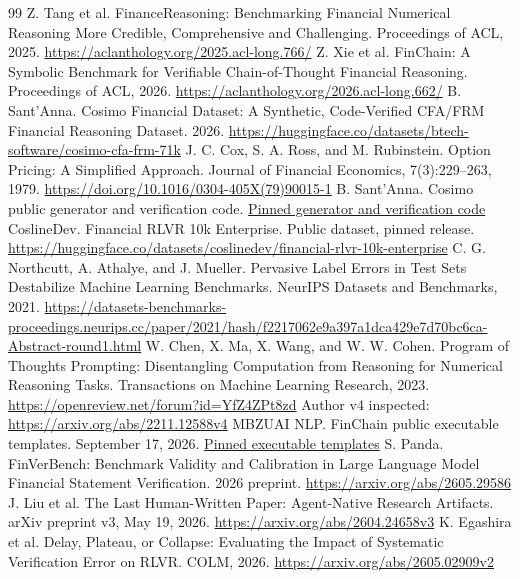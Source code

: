 \begin{thebibliography}{99}
 Z. Tang et al. FinanceReasoning: Benchmarking Financial Numerical Reasoning More Credible, Comprehensive and Challenging. Proceedings of ACL, 2025. \url{https://aclanthology.org/2025.acl-long.766/}
 Z. Xie et al. FinChain: A Symbolic Benchmark for Verifiable Chain-of-Thought Financial Reasoning. Proceedings of ACL, 2026. \url{https://aclanthology.org/2026.acl-long.662/}
 B. Sant'Anna. Cosimo Financial Dataset: A Synthetic, Code-Verified CFA/FRM Financial Reasoning Dataset. 2026. \url{https://huggingface.co/datasets/btech-software/cosimo-cfa-frm-71k}
 J. C. Cox, S. A. Ross, and M. Rubinstein. Option Pricing: A Simplified Approach. Journal of Financial Economics, 7(3):229--263, 1979. \url{https://doi.org/10.1016/0304-405X(79)90015-1}
 B. Sant'Anna. Cosimo public generator and verification code. \href{https://github.com/btech-software/cosimo/tree/20668622104bf8237837efd67debd1419f7bbe33/dataset}{Pinned generator and verification code}
 CoslineDev. Financial RLVR 10k Enterprise. Public dataset, pinned release. \url{https://huggingface.co/datasets/coslinedev/financial-rlvr-10k-enterprise}
 C. G. Northcutt, A. Athalye, and J. Mueller. Pervasive Label Errors in Test Sets Destabilize Machine Learning Benchmarks. NeurIPS Datasets and Benchmarks, 2021. \url{https://datasets-benchmarks-proceedings.neurips.cc/paper/2021/hash/f2217062e9a397a1dca429e7d70bc6ca-Abstract-round1.html}
 W. Chen, X. Ma, X. Wang, and W. W. Cohen. Program of Thoughts Prompting: Disentangling Computation from Reasoning for Numerical Reasoning Tasks. Transactions on Machine Learning Research, 2023. \url{https://openreview.net/forum?id=YfZ4ZPt8zd} Author v4 inspected: \url{https://arxiv.org/abs/2211.12588v4}
 MBZUAI NLP. FinChain public executable templates. September 17, 2026. \href{https://github.com/mbzuai-nlp/finchain/tree/9bd2942b85d992844b77094a8b822aa16832703c}{Pinned executable templates}
 S. Panda. FinVerBench: Benchmark Validity and Calibration in Large Language Model Financial Statement Verification. 2026 preprint. \url{https://arxiv.org/abs/2605.29586}
 J. Liu et al. The Last Human-Written Paper: Agent-Native Research Artifacts. arXiv preprint v3, May 19, 2026. \url{https://arxiv.org/abs/2604.24658v3}
 K. Egashira et al. Delay, Plateau, or Collapse: Evaluating the Impact of Systematic Verification Error on RLVR. COLM, 2026. \url{https://arxiv.org/abs/2605.02909v2}

\end{thebibliography}
